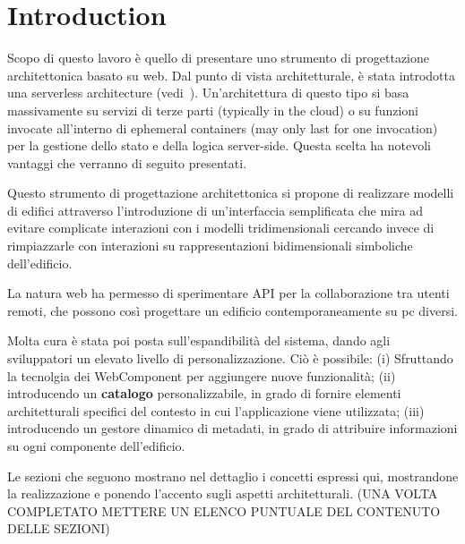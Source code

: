 \section{Introduction}

Scopo di questo lavoro \`e quello di presentare uno strumento di progettazione architettonica basato su web. Dal punto di vista architetturale, è stata introdotta una serverless architecture (vedi~\cite{Roberts}). Un'architettura di questo tipo si basa massivamente su servizi di terze parti (typically in the cloud) o su funzioni invocate all'interno di ephemeral containers (may only last for one invocation) per la gestione dello stato e della logica server-side. Questa scelta ha notevoli vantaggi che verranno di seguito presentati.

Questo strumento di progettazione architettonica si propone di realizzare modelli di edifici attraverso l'introduzione di un'interfaccia semplificata che mira ad evitare complicate interazioni con i modelli tridimensionali cercando invece di rimpiazzarle con interazioni su rappresentazioni bidimensionali simboliche dell'edificio.

La natura web ha permesso di sperimentare API per la collaborazione tra utenti remoti, che possono cos\`i progettare un edificio contemporaneamente su pc diversi.

Molta cura \`e stata poi posta sull'espandibilit\`a del sistema, dando agli sviluppatori un elevato livello di personalizzazione. Ciò è possibile: (i) Sfruttando la tecnolgia dei WebComponent per aggiungere nuove funzionalità; (ii) introducendo un \textbf{catalogo} personalizzabile, in grado di fornire elementi architetturali specifici del contesto in cui l'applicazione viene utilizzata; (iii) introducendo un gestore dinamico di metadati, in grado di attribuire informazioni su ogni componente dell'edificio.


Le sezioni che seguono mostrano nel dettaglio i concetti espressi qui, mostrandone la realizzazione e ponendo l'accento sugli aspetti architetturali. (UNA VOLTA COMPLETATO METTERE UN ELENCO PUNTUALE DEL CONTENUTO DELLE SEZIONI)
